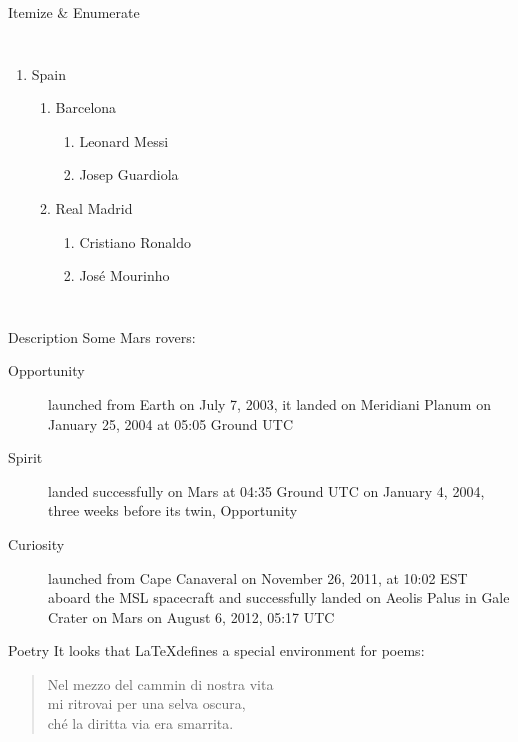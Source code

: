\begin{frame}{Itemize \& Enumerate}
\begin{columns}
\begin{enumerate}
\item Spain
      \begin{enumerate}
      \item Barcelona
            \begin{enumerate}
            \item Leonard Messi
            \item Josep Guardiola
            \end{enumerate}
      \item Real Madrid
            \begin{enumerate}
            \item Cristiano Ronaldo
            \item José Mourinho
            \end{enumerate}
      \end{enumerate}
\end{enumerate}
\end{columns}
\end{frame}

\begin{frame}{Description}
Some Mars rovers:

\begin{description}
\item[Opportunity] launched from Earth on July 7, 2003, it landed on Meridiani
                   Planum on January 25, 2004 at 05:05 Ground UTC
\item[Spirit] landed successfully on Mars at 04:35 Ground UTC on January 4,
              2004, three weeks before its twin, Opportunity
\item[Curiosity] launched from Cape Canaveral on November 26, 2011, at 10:02 EST
                 aboard the MSL spacecraft and successfully landed on Aeolis
                 Palus in Gale Crater on Mars on August 6, 2012, 05:17 UTC
\end{description}
\end{frame}

\begin{frame}{Poetry}
It looks that \LaTeX defines a special environment for poems:

\begin{verse}
Nel mezzo del cammin di nostra vita \\
mi ritrovai per una selva oscura, \\
ché la diritta via era smarrita.
\end{verse}

\end{frame}


